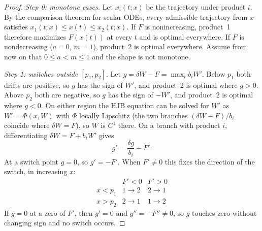 \documentclass[11pt]{article}
\theoremstyle{definition}
\begin{document}
\begin{proof}
\emph{Step 0: monotone cases.} Let $x_i(t;x)$ be the trajectory under
product $i$. By the comparison theorem for scalar ODEs, every admissible
trajectory from $x$ satisfies $x_1(t;x)\leq x(t)\leq x_2(t;x)$. If $F$ is
nonincreasing, product~1 therefore maximizes $F(x(t))$ at every $t$ and is
optimal everywhere. If $F$ is nondecreasing ($a=0$, $m=1$), product~2 is
optimal everywhere. Assume from now on that $0\leq a<m\leq1$ and the shape
is not monotone.

\emph{Step 1: switches outside $[p_1,p_2]$.} Let $g=\delta W-F
=\max_ib_iW'$. Below $p_1$ both drifts are positive, so $g$ has the sign of
$W'$, and product~2 is optimal where $g>0$. Above $p_2$ both are negative,
so $g$ has the sign of $-W'$, and product~2 is optimal where $g<0$. On
either region the HJB equation can be solved for $W'$ as
$W'=\Phi(x,W)$ with $\Phi$ locally Lipschitz (the two branches
$(\delta W-F)/b_i$ coincide where $\delta W=F$), so $W$ is $C^1$ there. On a
branch with product $i$, differentiating $\delta W=F+b_iW'$ gives
\begin{equation*}
g'=\frac{\delta g}{b_i}-F'.
\end{equation*}
At a switch point $g=0$, so $g'=-F'$. When $F'\neq0$ this fixes the
direction of the switch, in increasing $x$:
\begin{equation*}\tag{$*$}
\begin{array}{c|cc}
 &F'<0&F'>0\\ \hline
x<p_1&1\to2&2\to1\\
x>p_2&2\to1&1\to2
\end{array}
\end{equation*}
If $g=0$ at a zero of $F'$, then $g'=0$ and $g''=-F''\neq0$, so $g$ touches
zero without changing sign and no switch occurs.


\end{proof}
\end{document}
